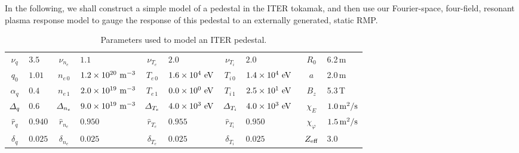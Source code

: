 \documentclass[12pt,prb,aps]{revtex4-1}
\begin{document}
In the following, we shall construct a simple model of a pedestal in the ITER tokamak, and then use our Fourier-space, four-field, resonant plasma 
response model to gauge the response of this  pedestal to an  externally generated, static RMP.

\begin{table}\centering
\begin{tabular}{|cl | cl | cl | cl | cl |}
$\nu_q$              &  $3.5$     & $\nu_{n_e}$               & $1.1$                                               & $\nu_{T_e}$             &  $2.0$                                        & $\nu_{T_i}$             &    $2.0$                                    & $R_0$ & 6.2\,m \\[0.5ex]
$q_0$                 & $1.01$    & $n_{e\,0}$                  & $1.2\times 10^{20}\,\,{\rm m}^{-3}$  & $T_{e\,0}$                &  $1.6\times 10^{4}\,\,{\rm eV}$ & $T_{i\,0}$                &  $1.4\times 10^{4}\,\,{\rm eV}$  & $a$ & 2.0\,m\\[0.5ex]
$\alpha_q$         & $0.4$      & $n_{e\,1}$                  & $2.0\times 10^{19}\,\,{\rm m}^{-3}$  & $T_{e\,1}$                &  $0.0\times 10^{0}\,\,{\rm eV}$ & $T_{i\,1}$                &  $2.5\times 10^{1}\,\,{\rm eV}$  &$B_z$ & 5.3\,T \\[0.5ex]
${\mit\Delta}_q$ & $0.6$      &  ${\mit\Delta}_{n_e}$  & $9.0\times 10^{19}\,\,{\rm m}^{-3}$  & ${\mit\Delta}_{T_e}$ &  $4.0\times 10^{3}\,\,{\rm eV}$ & ${\mit\Delta}_{T_i}$ &  $4.0\times 10^{3}\,\,{\rm eV}$\ & $\chi_E$ & $1.0\,{\rm m^2/s}$\\[0.5ex]
$\hat{r}_q$         & $0.940$   & $\hat{r}_{n_e}$           & $0.950$                                            & $\hat{r}_{T_e}$         &  $0.955$                                 & $\hat{r}_{T_i}$         &  $0.950$                                    & $\chi_\varphi$ &$1.5\,{\rm m^2/s}$ \\[0.5ex]
$\delta_q$          & $0.025$  & $\delta_{n_e}$            & $0.025$                                            & $\delta_{T_e}$          &  $0.025$                                   & $\delta_{T_i}$         & $0.025$                                     & $Z_{\rm eff}$ & 3.0 \\[0.5ex]
\end{tabular}
\caption{Parameters used to model an ITER pedestal.}\label{t2}
\end{table}
\end{document}
